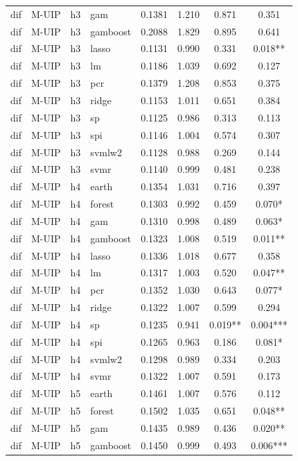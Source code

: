 \begin{ThreePartTable}
\begin{longtable}[t]{llclcccc}
dif & M-UIP & h3 & gam & 0.1381 & 1.210 & 0.871 & 0.351\\
dif & M-UIP & h3 & gamboost & 0.2088 & 1.829 & 0.895 & 0.641\\
dif & M-UIP & h3 & lasso & 0.1131 & 0.990 & 0.331 & 0.018**\\
dif & M-UIP & h3 & lm & 0.1186 & 1.039 & 0.692 & 0.127\\
dif & M-UIP & h3 & pcr & 0.1379 & 1.208 & 0.853 & 0.375\\
dif & M-UIP & h3 & ridge & 0.1153 & 1.011 & 0.651 & 0.384\\
dif & M-UIP & h3 & sp & 0.1125 & 0.986 & 0.313 & 0.113\\
dif & M-UIP & h3 & spi & 0.1146 & 1.004 & 0.574 & 0.307\\
dif & M-UIP & h3 & svmlw2 & 0.1128 & 0.988 & 0.269 & 0.144\\
dif & M-UIP & h3 & svmr & 0.1140 & 0.999 & 0.481 & 0.238\\
\addlinespace
dif & M-UIP & h4 & earth & 0.1354 & 1.031 & 0.716 & 0.397\\
dif & M-UIP & h4 & forest & 0.1303 & 0.992 & 0.459 & 0.070*\\
dif & M-UIP & h4 & gam & 0.1310 & 0.998 & 0.489 & 0.063*\\
dif & M-UIP & h4 & gamboost & 0.1323 & 1.008 & 0.519 & 0.011**\\
dif & M-UIP & h4 & lasso & 0.1336 & 1.018 & 0.677 & 0.358\\
dif & M-UIP & h4 & lm & 0.1317 & 1.003 & 0.520 & 0.047**\\
dif & M-UIP & h4 & pcr & 0.1352 & 1.030 & 0.643 & 0.077*\\
dif & M-UIP & h4 & ridge & 0.1322 & 1.007 & 0.599 & 0.294\\
dif & M-UIP & h4 & sp & 0.1235 & 0.941 & 0.019** & 0.004***\\
dif & M-UIP & h4 & spi & 0.1265 & 0.963 & 0.186 & 0.081*\\
dif & M-UIP & h4 & svmlw2 & 0.1298 & 0.989 & 0.334 & 0.203\\
dif & M-UIP & h4 & svmr & 0.1322 & 1.007 & 0.591 & 0.173\\
\addlinespace
dif & M-UIP & h5 & earth & 0.1461 & 1.007 & 0.576 & 0.112\\
dif & M-UIP & h5 & forest & 0.1502 & 1.035 & 0.651 & 0.048**\\
dif & M-UIP & h5 & gam & 0.1435 & 0.989 & 0.436 & 0.020**\\
dif & M-UIP & h5 & gamboost & 0.1450 & 0.999 & 0.493 & 0.006***\\

\end{longtable}
\end{ThreePartTable}
